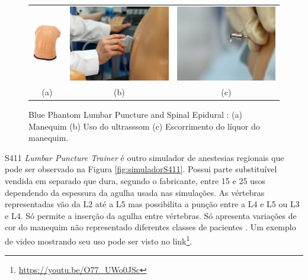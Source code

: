 \begin{figure}[ht!]
    \centering
        \begin{tabular}{ccc}
        \includegraphics[width=0.17\linewidth]{capitulos/figuras/BluePhatom-manequim.png} & 
        \includegraphics[width=0.3\linewidth]{capitulos/figuras/BluePhatom-ultrassom.jpg} 
        &
        \includegraphics[width=0.3\linewidth]{capitulos/figuras/BluePhatom-escorrimentoLiquor.jpg} 
        \\
        (a) & (b) & (c)
        \end{tabular}
    \caption{Blue Phantom Lumbar Puncture and Spinal Epidural \cite{BluePhantom2011}: (a) Manequim (b) Uso do ultrasssom (c) Escorrimento do líquor do manequim.}
    \label{fig:bluePhantom}
\end{figure}

S411 \textit{Lumbar Puncture Trainer} é outro simulador de anestesias regionais que pode ser observado na Figura \ref{fig:simuladorS411}. Possui parte substituível vendida em separado que dura, segundo o fabricante, entre 15 e 25 usos dependendo da espessura da agulha usada nas simulações. As vértebras representadas vão da L2 até a L5 mas possibilita a punção entre a L4 e L5 ou L3 e L4. Só permite a inserção da agulha entre vértebras. Só apresenta variações de cor do manequim não representado diferentes classes de pacientes \cite{GaumardScientific}. Um exemplo de video mostrando seu uso pode ser visto no link\footnote{\url{https://youtu.be/O77\_UWo0JSc}}.

